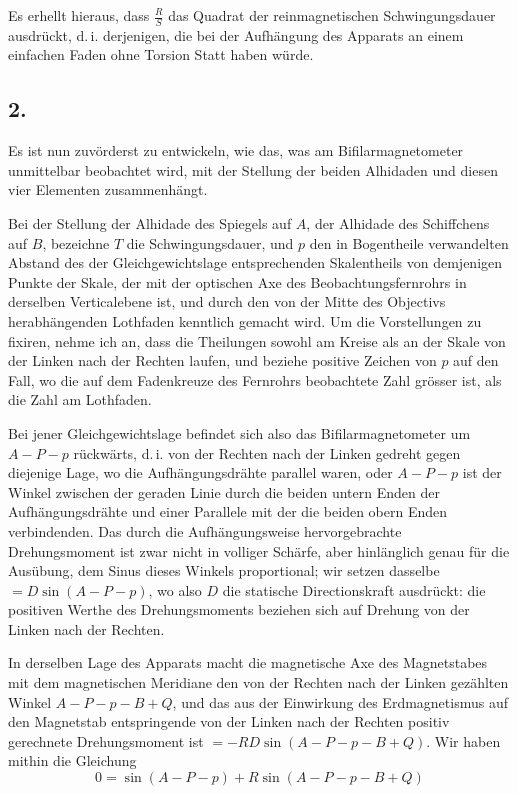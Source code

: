 \documentclass[12pt,a4paper]{article}
\begin{document}
Es erhellt hieraus, dass $\tfrac{R}{S}$ das Quadrat der reinmagnetischen Schwingungsdauer ausdrückt, d.\,i. derjenigen, die bei der Aufhängung des Apparats an einem einfachen Faden ohne Torsion Statt haben würde.

\subsection*{2.}

Es ist nun zuvörderst zu entwickeln, wie das, was am Bifilarmagnetometer unmittelbar beobachtet wird, mit der Stellung der beiden Alhidaden und diesen vier Elementen zusammenhängt.

Bei der Stellung der Alhidade des Spiegels auf $A$, der Alhidade des Schiffchens auf $B$, bezeichne $T$ die Schwingungsdauer, und $p$ den in Bogentheile verwandelten Abstand des der Gleichgewichtslage entsprechenden Skalentheils von demjenigen Punkte der Skale, der mit der optischen Axe des Beobachtungsfernrohrs in derselben Verticalebene ist, und durch den von der Mitte des Objectivs herabhängenden Lothfaden kenntlich gemacht wird. Um die Vorstellungen zu fixiren, nehme ich an, dass die Theilungen sowohl am Kreise als an der Skale von der Linken nach der Rechten laufen, und beziehe positive Zeichen von $p$ auf den Fall, wo die auf dem Fadenkreuze des Fernrohrs beobachtete Zahl grösser ist, als die Zahl am Lothfaden.

Bei jener Gleichgewichtslage befindet sich also das Bifilarmagnetometer um $A - P - p$ rückwärts, d.\,i. von der Rechten nach der Linken gedreht gegen diejenige Lage, wo die Aufhängungsdrähte parallel waren, oder $A - P - p$ ist der Winkel zwischen der geraden Linie durch die beiden untern Enden der Aufhängungsdrähte und einer Parallele mit der die beiden obern Enden verbindenden. Das durch die Aufhängungsweise hervorgebrachte Drehungsmoment ist zwar nicht in volliger Schärfe, aber hinlänglich genau für die Ausübung, dem Sinus dieses Winkels proportional; wir setzen dasselbe $= D\sin(A - P - p)$, wo also $D$ die statische Directionskraft ausdrückt: die positiven Werthe des Drehungsmoments beziehen sich auf Drehung von der Linken nach der Rechten.

In derselben Lage des Apparats macht die magnetische Axe des Magnetstabes mit dem magnetischen Meridiane den von der Rechten nach der Linken gezählten Winkel $A - P - p - B + Q$, und das aus der Einwirkung des Erdmagnetismus auf den Magnetstab entspringende von der Linken nach der Rechten positiv gerechnete Drehungsmoment ist $= -RD\sin(A - P - p - B + Q)$. Wir haben mithin die Gleichung
\begin{equation}
0 = \sin(A - P - p) + R\sin(A - P - p - B + Q)
\end{equation}
\end{document}
